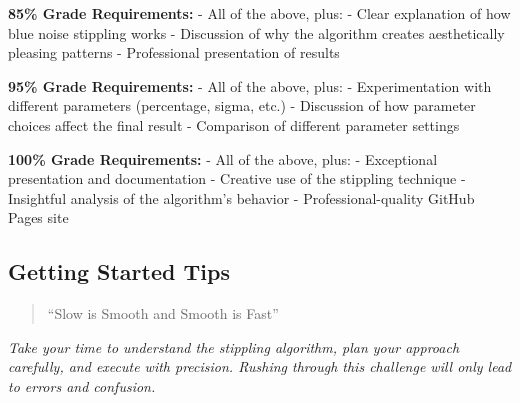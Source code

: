 \documentclass[
  letterpaper,
  DIV=11,
  numbers=noendperiod]{scrartcl}
\begin{document}
\textbf{85\% Grade Requirements:} - All of the above, plus: - Clear
explanation of how blue noise stippling works - Discussion of why the
algorithm creates aesthetically pleasing patterns - Professional
presentation of results

\textbf{95\% Grade Requirements:} - All of the above, plus: -
Experimentation with different parameters (percentage, sigma, etc.) -
Discussion of how parameter choices affect the final result - Comparison
of different parameter settings

\textbf{100\% Grade Requirements:} - All of the above, plus: -
Exceptional presentation and documentation - Creative use of the
stippling technique - Insightful analysis of the algorithm's behavior -
Professional-quality GitHub Pages site

\subsection{Getting Started Tips 🚀}\label{getting-started-tips}

\begin{tcolorbox}[enhanced jigsaw, coltitle=black, breakable, colframe=quarto-callout-note-color-frame, opacitybacktitle=0.6, colbacktitle=quarto-callout-note-color!10!white, opacityback=0, toprule=.15mm, bottomtitle=1mm, colback=white, left=2mm, title=\textcolor{quarto-callout-note-color}{\faInfo}\hspace{0.5em}{🎯 Navy SEALs Motto}, toptitle=1mm, rightrule=.15mm, leftrule=.75mm, bottomrule=.15mm, titlerule=0mm, arc=.35mm]

\begin{quote}
``Slow is Smooth and Smooth is Fast''
\end{quote}

\emph{Take your time to understand the stippling algorithm, plan your
approach carefully, and execute with precision. Rushing through this
challenge will only lead to errors and confusion.}

\end{tcolorbox}
\end{document}
